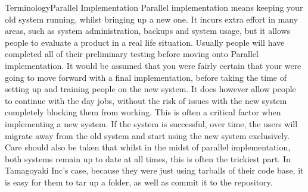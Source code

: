 \begin{callout}{Terminology}{Parallel Implementation}
Parallel implementation means keeping your old system running, whilst bringing up a new one.  It incurs extra effort in many areas, such as system administration, backups and system usage, but it allows people to evaluate a product in a real life situation.  Usually people will have completed all of their preliminary testing before moving onto Parallel implementation.  It would be assumed that you were fairly certain that your were going to move forward with a final implementation, before taking the time of setting up and training people on the new system.
\newline
\newline
It does however allow people to continue with the day jobs, without the risk of issues with the new system completely blocking them from working.  This is often a critical factor when implementing a new system.  If the system is successful, over time, the users will migrate away from the old system and start using the new system exclusively.  Care should also be taken that whilst in the midst of parallel implementation, both systems remain up to date at all times, this is often the trickiest part.  In Tamagoyaki Inc's case, because they were just using tarballs of their code base, it is easy for them to tar up a folder, as well as commit it to the repository.
\end{callout}

